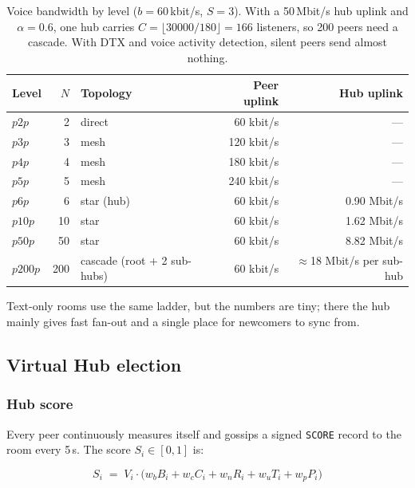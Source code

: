 \documentclass[11pt,a4paper]{article}
\begin{document}
\begin{table}[ht]
\centering
\small
\begin{tabular}{@{}lrlrr@{}}
\toprule
\textbf{Level} & $N$ & \textbf{Topology} & \textbf{Peer uplink} & \textbf{Hub uplink} \\
\midrule
$p2p$ & 2 & direct          & 60 kbit/s  & --- \\
$p3p$ & 3 & mesh            & 120 kbit/s & --- \\
$p4p$ & 4 & mesh            & 180 kbit/s & --- \\
$p5p$ & 5 & mesh            & 240 kbit/s & --- \\
$p6p$ & 6 & star (hub)      & 60 kbit/s  & 0.90 Mbit/s \\
$p10p$ & 10 & star          & 60 kbit/s  & 1.62 Mbit/s \\
$p50p$ & 50 & star          & 60 kbit/s  & 8.82 Mbit/s \\
$p200p$ & 200 & cascade (root + 2 sub-hubs) & 60 kbit/s & $\approx$18 Mbit/s per sub-hub \\
\bottomrule
\end{tabular}
\caption{Voice bandwidth by level ($b = 60$\,kbit/s, $S = 3$). With a 50\,Mbit/s hub uplink
and $\alpha=0.6$, one hub carries $C = \lfloor 30000/180 \rfloor = 166$ listeners, so 200
peers need a cascade. With DTX and voice activity detection, silent peers send almost nothing.}
\label{tab:bw}
\end{table}

Text-only rooms use the same ladder, but the numbers are tiny; there the hub mainly
gives fast fan-out and a single place for newcomers to sync from.

\subsection{Virtual Hub election}
\label{sec:election}

\subsubsection{Hub score}
Every peer continuously measures itself and gossips a signed \texttt{SCORE} record to the
room every 5\,s. The score $S_i \in [0,1]$ is:

\begin{equation}
S_i \;=\; V_i \cdot \big( w_b B_i + w_c C_i + w_n R_i + w_u T_i + w_p P_i \big)
\label{eq:score}
\end{equation}
\end{document}
